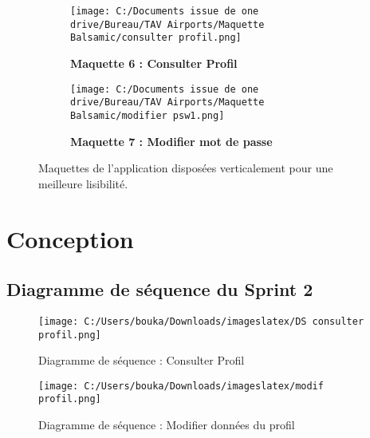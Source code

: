 \documentclass[a4paper,11pt]{report}
\begin{document}
\begin{figure}[H]
  \vspace{0.8cm}

  \begin{subfigure}[b]{0.8\textwidth}
    \texttt{[image: C:/Documents issue de one drive/Bureau/TAV Airports/Maquette Balsamic/consulter profil.png]}
    \caption{\textbf{Maquette 6 : Consulter Profil}}
    \label{fig:maquette5}
  \end{subfigure}

  \vspace{0.8cm}
\newpage
  \begin{subfigure}[b]{0.8\textwidth}
    \texttt{[image: C:/Documents issue de one drive/Bureau/TAV Airports/Maquette Balsamic/modifier psw1.png]}
    \caption{\textbf{Maquette 7 : Modifier mot de passe}}
    \label{fig:maquette6}
  \end{subfigure}

  \caption{Maquettes de l’application disposées verticalement pour une meilleure lisibilité.}
  \label{fig:vertical-maquettes}
\end{figure}






\newpage

\section{Conception}
\subsection{Diagramme de séquence du Sprint 2}


\begin{figure}[htbp]
  \centering
  \texttt{[image: C:/Users/bouka/Downloads/imageslatex/DS consulter profil.png]}
  \caption{Diagramme de séquence : Consulter Profil}
  \label{fig:consulter_profil}
\end{figure}

\begin{figure}[htbp]
  \centering
  \texttt{[image: C:/Users/bouka/Downloads/imageslatex/modif profil.png]}
  \caption{Diagramme de séquence : Modifier données du profil}
  \label{fig:modifier_donnees_profil}
\end{figure}
\end{document}

